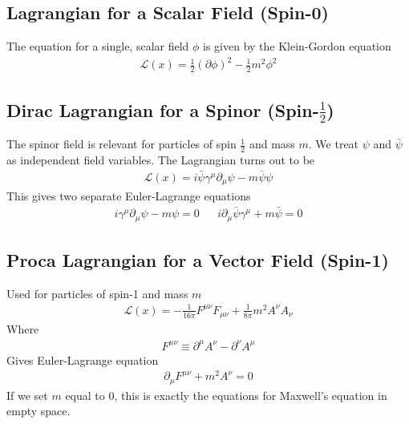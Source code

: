 \subsection{Lagrangian for a Scalar Field (Spin-0)}
The equation for a single, scalar field $\phi$ is given by the Klein-Gordon equation
\begin{align}\label{kg-lagrange}
\mathcal{L}(x) = \frac{1}{2}(\partial\phi)^2 - \frac{1}{2}m^2\phi^2
\end{align}
\subsection{Dirac Lagrangian for a Spinor (Spin-$\frac{1}{2}$)}
The spinor field is relevant for particles of spin $\frac{1}{2}$ and mass $m$. We treat $\psi$ and $\bar{\psi}$ as independent field variables. The Lagrangian turns out to be
\begin{align}\label{dirac_lagrangian}
\mathcal{L}(x) = i\bar{\psi}\gamma^\mu\partial_\mu\psi - m\bar{\psi}\psi
\end{align}
This gives two separate Euler-Lagrange equations
\begin{align}
i\gamma^\mu\partial_\mu\psi - m\psi = 0 && i\partial_\mu\bar{\psi}\gamma^\mu + m \bar{\psi} = 0
\end{align}
\subsection{Proca Lagrangian for a Vector Field (Spin-1)}
Used for particles of spin-1 and mass $m$
\begin{align}\label{proca}
\mathcal{L}(x) = -\frac{1}{16\pi}F^{\mu\nu}F_{\mu\nu} +\frac{1}{8\pi}m^2A^\nu A_\nu
\end{align}
Where 
\begin{align}
F^{\mu\nu}\equiv \partial^\mu A^\nu -\partial^\nu A^\mu
\end{align}
Gives Euler-Lagrange equation
\begin{align}
\partial_\mu F^{\mu\nu} + m^2A^\nu = 0
\end{align}
If we set $m$ equal to 0, this is exactly the equations for Maxwell's equation in empty space.

